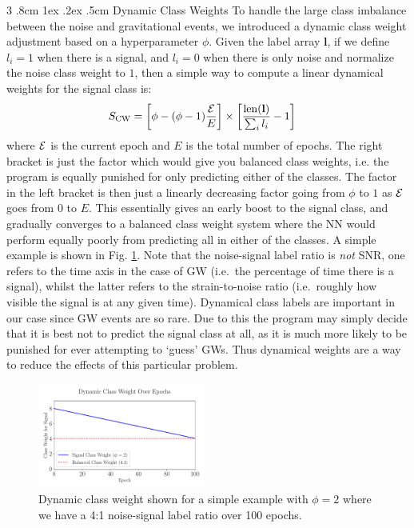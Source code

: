 \documentclass[%
reprint,
amsmath,amssymb,
aps,
]{revtex4-2}
\makeatletter
\renewcommand{\subsubsection}{%
	\@startsection
	{subsubsection}%
	{3}%
	{\z@}%
	{.8cm \@plus1ex \@minus .2ex}%
	{.5cm}%
	{\normalfont\small\centering}%
}
\makeatother
\begin{document}
\subsubsection{Dynamic Class Weights}
To handle the large class imbalance between the noise and gravitational events, we introduced a dynamic class weight adjustment based on a hyperparameter $\phi$. Given the label array $\textbf{l}$, if we define $l_i=1$ when there is a signal, and $l_i=0$ when there is only noise and normalize the noise class weight to $1$, then a simple way to compute a linear dynamical weights for the signal class is:
\begin{align}	\label{eq:dynamical_signal_weights}
	S_{\text{CW}}&=\left[\phi-(\phi-1)\frac{\varE}{E}\right]\times\left[\frac{{\rm len}(\textbf{l})}{\sum_i l_i}-1\right]
\end{align}
where $\varE$ is the current epoch and $E$ is the total number of epochs. The right bracket is just the factor which would give you balanced class weights, i.e. the program is equally punished for only predicting either of the classes. The factor in the left bracket is then just a linearly decreasing factor going from $\phi$ to $1$ as $\varE$ goes from $0$ to $E$. This essentially gives an early boost to the signal class, and gradually converges to a balanced class weight system where the NN would perform equally poorly from predicting all in either of the classes. A simple example is shown in Fig. \ref{fig:DynamicCW}. Note that the noise-signal label ratio is \textit{not} SNR, one refers to the time axis in the case of GW (i.e.~the percentage of time there is a signal), whilst the latter refers to the strain-to-noise ratio (i.e.~roughly how visible the signal is at any given time). Dynamical class labels are important in our case since GW events are so rare. Due to this the program may simply decide that it is best not to predict the signal class at all, as it is much more likely to be punished for ever attempting to `guess' GWs. Thus dynamical weights are a way to reduce the effects of this particular problem.
\begin{figure}[H]
	\includegraphics[width=0.49\textwidth]{Figures/DynamicCW.pdf}
	\caption{Dynamic class weight shown for a simple example with $\phi=2$ where we have a 4:1 noise-signal label ratio over 100 epochs.}
	\label{fig:DynamicCW}
\end{figure}
\end{document}
